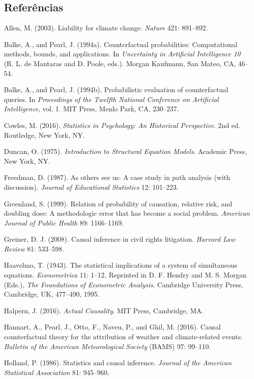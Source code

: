 \documentclass[11pt,a5paper,twoside]{book}
\begin{document}
\subsection{Referências}
Allen, M. (2003). Liability for climate change. \textit{Nature} 421: 891–892.

Balke, A., and Pearl, J. (1994a). Counterfactual probabilities: Computational methods, bounds, and applications. In \textit{Uncertainty in Artificial Intelligence 10} (R. L. de Mantaras and D. Poole, eds.). Morgan Kaufmann, San Mateo, CA, 46–54.

Balke, A., and Pearl, J. (1994b). Probabilistic evaluation of counterfactual queries. In \textit{Proceedings of the Twelfth National Conference on Artificial Intelligence}, vol. 1. MIT Press, Menlo Park, CA, 230–237.

Cowles, M. (2016). \textit{Statistics in Psychology: An Historical Perspective}. 2nd ed. Routledge, New York, NY.

Duncan, O. (1975). \textit{Introduction to Structural Equation Models}. Academic Press, New York, NY.

Freedman, D. (1987). As others see us: A case study in path analysis (with discussion). \textit{Journal of Educational Statistics} 12: 101–223.

Greenland, S. (1999). Relation of probability of causation, relative risk, and doubling dose: A methodologic error that has become a social problem. \textit{American Journal of Public Health} 89: 1166–1169.

Greiner, D. J. (2008). Causal inference in civil rights litigation. \textit{Harvard Law Review} 81: 533–598.

Haavelmo, T. (1943). The statistical implications of a system of simultaneous equations. \textit{Econometrica} 11: 1–12. Reprinted in D. F. Hendry and M. S. Morgan (Eds.), \textit{The Foundations of Econometric Analysis}, Cambridge University Press, Cambridge, UK, 477–490, 1995.

Halpern, J. (2016). \textit{Actual Causality}. MIT Press, Cambridge, MA.

Hannart, A., Pearl, J., Otto, F., Naveu, P., and Ghil, M. (2016). Causal counterfactual theory for the attribution of weather and climate-related events. \textit{Bulletin of the American Meteorological Society} (BAMS) 97: 99–110.

Holland, P. (1986). Statistics and causal inference. \textit{Journal of the American Statistical Association} 81: 945–960.
\end{document}
